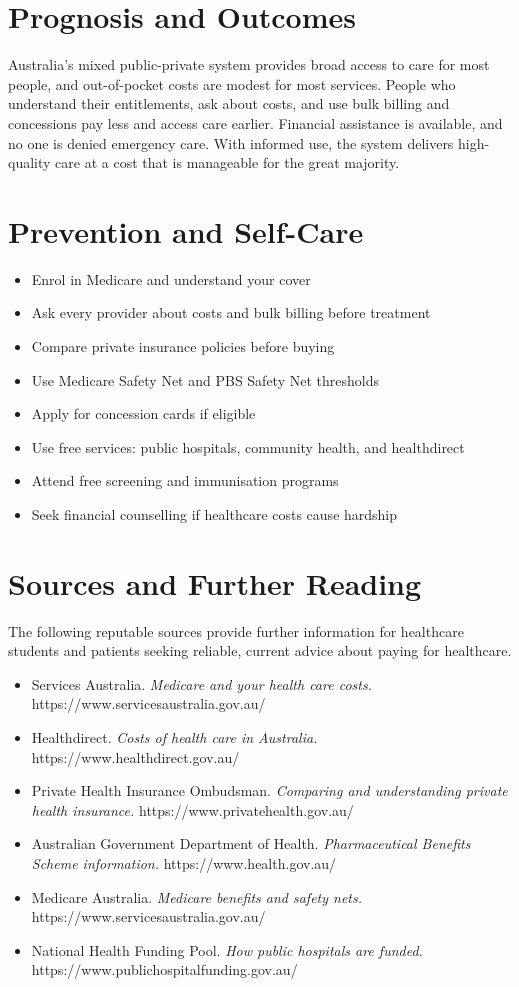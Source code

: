\section*{Prognosis and Outcomes}
Australia's mixed public-private system provides broad access to care for most people, and out-of-pocket costs are modest for most services. People who understand their entitlements, ask about costs, and use bulk billing and concessions pay less and access care earlier. Financial assistance is available, and no one is denied emergency care. With informed use, the system delivers high-quality care at a cost that is manageable for the great majority.

\section*{Prevention and Self-Care}
\begin{itemize}
    \item Enrol in Medicare and understand your cover
    \item Ask every provider about costs and bulk billing before treatment
    \item Compare private insurance policies before buying
    \item Use Medicare Safety Net and PBS Safety Net thresholds
    \item Apply for concession cards if eligible
    \item Use free services: public hospitals, community health, and healthdirect
    \item Attend free screening and immunisation programs
    \item Seek financial counselling if healthcare costs cause hardship
\end{itemize}

\section*{Sources and Further Reading}
The following reputable sources provide further information for healthcare students and patients seeking reliable, current advice about paying for healthcare.

\begin{itemize}
    \item Services Australia. \textit{Medicare and your health care costs.} https://www.servicesaustralia.gov.au/
    \item Healthdirect. \textit{Costs of health care in Australia.} https://www.healthdirect.gov.au/
    \item Private Health Insurance Ombudsman. \textit{Comparing and understanding private health insurance.} https://www.privatehealth.gov.au/
    \item Australian Government Department of Health. \textit{Pharmaceutical Benefits Scheme information.} https://www.health.gov.au/
    \item Medicare Australia. \textit{Medicare benefits and safety nets.} https://www.servicesaustralia.gov.au/
    \item National Health Funding Pool. \textit{How public hospitals are funded.} https://www.publichospitalfunding.gov.au/
\end{itemize}
